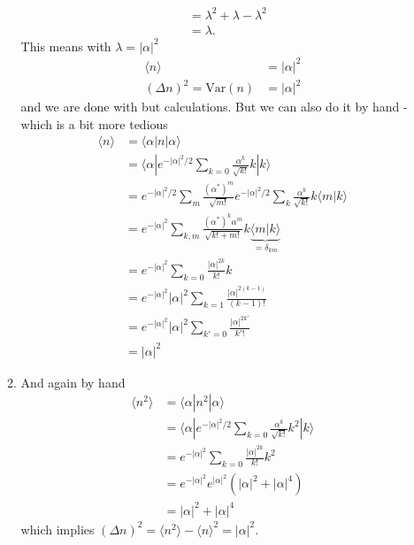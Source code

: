 \documentclass{article}
\begin{document}
\begin{enumerate}
\begin{enumerate}
\begin{align}
        &=\lambda^2+\lambda-\lambda^2\\
        &=\lambda.
    \end{align}
    This means with $\lambda=|\alpha|^2$
    \begin{align}
        \langle n\rangle&=|\alpha|^2\\
        (\Delta n)^2=\text{Var}(n)&=|\alpha|^2
    \end{align}
    and we are done with but calculations. But we can also do it by hand - which is a bit more tedious
    \begin{align}
        \langle n\rangle
        &=\langle\alpha|n|\alpha\rangle\\
        &=\langle\alpha| e^{-|\alpha|^2/2}\sum_{k=0}\frac{\alpha^k}{\sqrt{k!}}k|k\rangle\\
        &=e^{-|\alpha|^2/2}\sum_m\frac{(\alpha^*)^m}{\sqrt{m!}} e^{-|\alpha|^2/2}\sum_k\frac{\alpha^k}{\sqrt{k!}}k\langle m|k\rangle\\
        &=e^{-|\alpha|^2}\sum_{k,m}\frac{(\alpha^*)^k\alpha^m}{\sqrt{k!+m!}} k\underbrace{\langle m|k\rangle}_{=\delta_{km}}\\
        &=e^{-|\alpha|^2}\sum_{k=0}\frac{|\alpha|^{2k}}{k!} k\\
        &=e^{-|\alpha|^2}|\alpha|^2\sum_{k=1}\frac{|\alpha|^{2(k-1)}}{(k-1)!}\\
        &=e^{-|\alpha|^2}|\alpha|^2\sum_{k'=0}\frac{|\alpha|^{2k'}}{k'!}\\
        &=|\alpha|^2
    \end{align}
    
    \item And again by hand 
    \begin{align}
        \langle n^2\rangle
        &=\langle\alpha|n^2|\alpha\rangle\\
        &=\langle\alpha| e^{-|\alpha|^2/2}\sum_{k=0}\frac{\alpha^k}{\sqrt{k!}}k^2|k\rangle\\
        &=e^{-|\alpha|^2}\sum_{k=0}\frac{|\alpha|^{2k}}{k!} k^2\\
        &=e^{-|\alpha|^2}e^{|\alpha|^2}(|\alpha|^2+|\alpha|^4)\\
        &=|\alpha|^2+|\alpha|^4
    \end{align}
    which implies $(\Delta n)^2=\langle n^2 \rangle-\langle n\rangle^2=|\alpha|^2$.
    \end{enumerate}
\end{enumerate}
\end{document}

